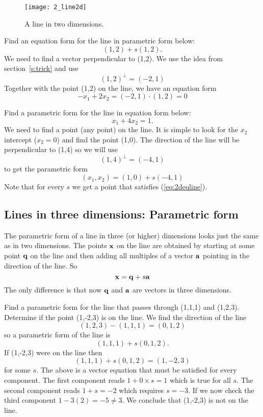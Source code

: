 \begin{figure}
\centerline{\texttt{[image: 2\_line2d]}}
\caption{A line in two dimensions. \label{fig_line2d}}
\end{figure}

\begin{example}
Find an equation form for the line in parametric form below:
\[
(1,2) + s (1,2).
\] 
{\rm We need to find a vector perpendicular to (1,2). We use the idea from section~\ref{s:trick}
and use 
\[
(1,2)^\perp = (-2,1) 
\]
Together with the point (1,2) on the line, we have an equation form 
\[
-x_1 + 2x_2 = (-2,1) \cdot (1,2) = 0 
\]
}
\end{example}

\begin{example} 
Find a parametric form for the line in equation form below:
\begin{equation}
\label{eq:2deqline} 
x_1 + 4 x_2 = 1. 
\end{equation} 
{\rm We need to find a point (any point) on the line. It is simple to look for the $x_2$ intercept ($x_2=0$) and find the point (1,0). The direction of the line will be perpendicular to (1,4) so we will use 
\[
(1,4)^\perp = (-4,1) 
\]
to get the parametric form 
\[
(x_1, x_2) = (1,0) + s(-4,1) 
\]
Note that for every $s$ we get a point that satisfies (\ref{eq:2deqline}). 
}
\end{example} 

\subsection{Lines in three dimensions: Parametric form}

The parametric form of a line in three (or higher) dimensions looks just
the same as in two dimensions. The points $\xx$ on the line are 
obtained by starting at
some point $\qq$ on the line and then adding all multiples 
of a vector $\aa$ pointing in the direction of the line. So
\[
\xx=\qq+s\aa
\]
The only difference is
that now $\qq$ and $\aa$ are vectors in three dimensions.

\begin{example} Find a parametric form for the line that passes through (1,1,1) and 
(1,2,3). Determine if the point (1,-2,3) is on the line. 
{\rm We find the direction of the line 
\[
(1,2,3) -(1,1,1) = (0,1,2) 
\]
so a parametric form of the line is 
\[
(1,1,1) + s(0,1,2). 
\]
If (1,-2,3) were on the line then 
\[
(1,1,1) + s(0,1,2) = (1,-2,3) 
\]
for some $s$. The above is a vector equation that must be satisfied for every component. The first component reads $1+0\times s = 1$ which is true for all $s$. The second component 
reads $1+s = -2$ which requires $s=-3$. If we now check the third component $1-3(2) = -5 \neq 3$. We conclude that (1,-2,3) is not on the line. 
}
\end{example}

